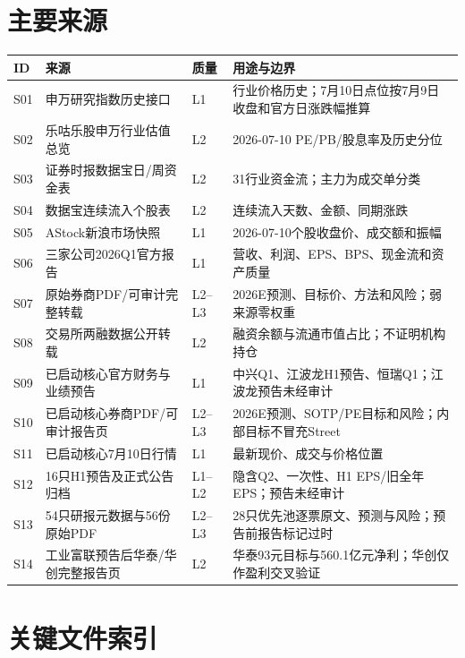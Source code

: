 \section{主要来源}

\begin{longtable}{L{1.0cm}L{3.2cm}L{1.5cm}L{7.4cm}}
\toprule
\textbf{ID} & \textbf{来源} & \textbf{质量} & \textbf{用途与边界} \\
\midrule
S01 & 申万研究指数历史接口 & L1 & 行业价格历史；7月10日点位按7月9日收盘和官方日涨跌幅推算 \\
S02 & 乐咕乐股申万行业估值总览 & L2 & 2026-07-10 PE/PB/股息率及历史分位 \\
S03 & 证券时报数据宝日/周资金表 & L2 & 31行业资金流；主力为成交单分类 \\
S04 & 数据宝连续流入个股表 & L2 & 连续流入天数、金额、同期涨跌 \\
S05 & AStock新浪市场快照 & L1 & 2026-07-10个股收盘价、成交额和振幅 \\
S06 & 三家公司2026Q1官方报告 & L1 & 营收、利润、EPS、BPS、现金流和资产质量 \\
S07 & 原始券商PDF/可审计完整转载 & L2--L3 & 2026E预测、目标价、方法和风险；弱来源零权重 \\
S08 & 交易所两融数据公开转载 & L2 & 融资余额与流通市值占比；不证明机构持仓 \\
S09 & 已启动核心官方财务与业绩预告 & L1 & 中兴Q1、江波龙H1预告、恒瑞Q1；江波龙预告未经审计 \\
S10 & 已启动核心券商PDF/可审计报告页 & L2--L3 & 2026E预测、SOTP/PE目标和风险；内部目标不冒充Street \\
S11 & 已启动核心7月10日行情 & L1 & 最新现价、成交与价格位置 \\
S12 & 16只H1预告及正式公告归档 & L1--L2 & 隐含Q2、一次性、H1 EPS/旧全年EPS；预告未经审计 \\
S13 & 54只研报元数据与56份原始PDF & L2--L3 & 28只优先池逐票原文、预测与风险；预告前报告标记过时 \\
S14 & 工业富联预告后华泰/华创完整报告页 & L2 & 华泰93元目标与560.1亿元净利；华创仅作盈利交叉验证 \\
\bottomrule
\end{longtable}

\section{关键文件索引}


